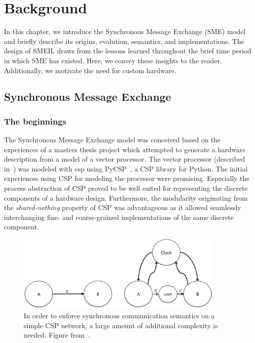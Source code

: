 \chapter{Background}
In this chapter, we introduce the Synchronous Message Exchange (SME) model and
briefly describe its origins, evolution, semantics, and implementations. The
design of SMEIL draws from the lessons learned throughout the brief time period
in which SME has existed. Here, we convey these insights to the
reader. Additionally, we motivate the need for custom hardware.

\section{Synchronous Message Exchange}
\label{sec:sme}

\subsection{The beginnings}
The Synchronous Message Exchange model was conceived based on the experiences of
a masters thesis project \cite{Skaarup14} which attempted to generate a hardware
description from a model of a vector processor. The vector processor (described
in~\cite{rehr2013bpu}) was modeled with \gls{csp} using
PyCSP~\cite{bjorndalen2007pycsp}, a CSP library for Python. The initial
experiences using CSP for modeling the processor were promising. Especially the
process abstraction of CSP proved to be well suited for representing the
discrete components of a hardware design. Furthermore, the modularity
originating from the {\itshape shared-nothing} %
property of CSP was advantageous as it allowed seamlessly interchanging fine-
and coarse-grained implementations of the same discrete component.

\begin{figure}
  \centering
  \includegraphics[width=0.9\textwidth]{figures/clocked.pdf}
  \caption{In order to enforce synchronous communication semantics on a simple
    CSP network, a large amount of additional complexity is needed. Figure
    from~\cite{vinter2014synchronous}.}
  \label{fig:clocked}
\end{figure}

